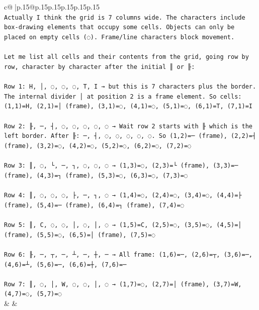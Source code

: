\documentclass{article}
\begin{document}
{\begin{supertabular}{c@{$\;$}|p{.15\linewidth}@{}p{.15\linewidth}p{.15\linewidth}p{.15\linewidth}p{.15\linewidth}p{.15\linewidth}}
{{{\\ 
\texttt{Actually I think the grid is 7 columns wide. The characters include box{-}drawing elements that occupy some cells. Objects can only be placed on empty cells (◌). Frame/line characters block movement.} \\
\\ 
\texttt{Let me list all cells and their contents from the grid, going row by row, character by character after the initial ║ or ╟:} \\
\\ 
\texttt{Row 1: H, │, ◌, ◌, ◌, T, I → but this is 7 characters plus the border. The internal divider │ at position 2 is a frame element. So cells: (1,1)=H, (2,1)=│ (frame), (3,1)=◌, (4,1)=◌, (5,1)=◌, (6,1)=T, (7,1)=I} \\
\\ 
\texttt{Row 2: ╟, ─, ┤, ◌, ◌, ◌, ◌, ◌ → Wait row 2 starts with ╟ which is the left border. After ╟: ─, ┤, ◌, ◌, ◌, ◌, ◌. So (1,2)=─ (frame), (2,2)=┤ (frame), (3,2)=◌, (4,2)=◌, (5,2)=◌, (6,2)=◌, (7,2)=◌} \\
\\ 
\texttt{Row 3: ║, ◌, └, ─, ┐, ◌, ◌, ◌ → (1,3)=◌, (2,3)=└ (frame), (3,3)=─ (frame), (4,3)=┐ (frame), (5,3)=◌, (6,3)=◌, (7,3)=◌} \\
\\ 
\texttt{Row 4: ║, ◌, ◌, ◌, ├, ─, ┐, ◌ → (1,4)=◌, (2,4)=◌, (3,4)=◌, (4,4)=├ (frame), (5,4)=─ (frame), (6,4)=┐ (frame), (7,4)=◌} \\
\\ 
\texttt{Row 5: ║, C, ◌, ◌, │, ◌, │, ◌ → (1,5)=C, (2,5)=◌, (3,5)=◌, (4,5)=│ (frame), (5,5)=◌, (6,5)=│ (frame), (7,5)=◌} \\
\\ 
\texttt{Row 6: ╟, ─, ┬, ─, ┴, ─, ┼, ─ → All frame: (1,6)=─, (2,6)=┬, (3,6)=─, (4,6)=┴, (5,6)=─, (6,6)=┼, (7,6)=─} \\
\\ 
\texttt{Row 7: ║, ◌, │, W, ◌, ◌, │, ◌ → (1,7)=◌, (2,7)=│ (frame), (3,7)=W, (4,7)=◌, (5,7)=◌} \\
            }
        }
    }
    & & \\ \\


\end{supertabular}}
\end{document}
